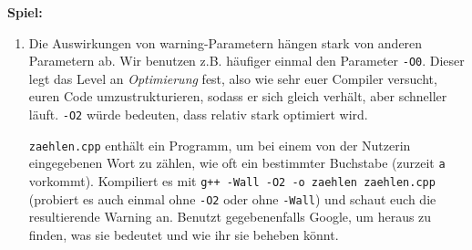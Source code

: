 
\textbf{Spiel:}
\begin{enumerate}
    \item Die Auswirkungen von warning-Parametern hängen stark von anderen
        Parametern ab. Wir benutzen z.B. häufiger einmal den Parameter
        \texttt{-O0}. Dieser legt das Level an \emph{Optimierung} fest, also
        wie sehr euer Compiler versucht, euren Code umzustrukturieren, sodass
        er sich gleich verhält, aber schneller läuft. \texttt{-O2} würde
        bedeuten, dass relativ stark optimiert wird.

        \texttt{zaehlen.cpp} enthält ein Programm, um bei einem von der Nutzerin eingegebenen Wort zu zählen, wie oft ein bestimmter Buchstabe (zurzeit \texttt{a} vorkommt).
        Kompiliert es mit \texttt{g++ -Wall -O2 -o zaehlen zaehlen.cpp} (probiert es auch einmal ohne \texttt{-O2} oder ohne \texttt{-Wall}) und schaut euch die resultierende Warning an.
        Benutzt gegebenenfalls Google, um heraus zu finden, was sie bedeutet und wie ihr sie beheben könnt.
\end{enumerate}

